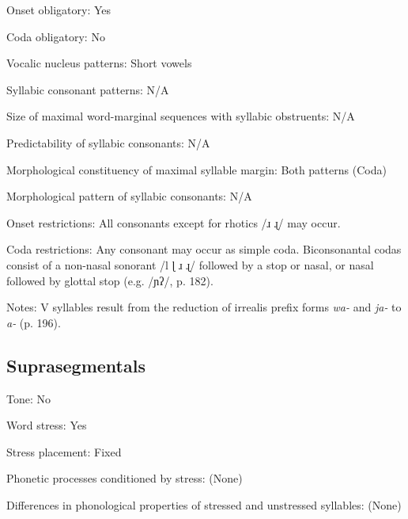 {\begin{appendixdesc}
\item[Onset obligatory:] Yes

\item[Coda obligatory:] No

\item[Vocalic nucleus patterns:] Short vowels

\item[Syllabic consonant patterns:] N/A

\item[Size of maximal word-marginal sequences with syllabic obstruents:] N/A

\item[Predictability of syllabic consonants:] N/A

\item[Morphological constituency of maximal syllable margin:] Both patterns (Coda)

\item[Morphological pattern of syllabic consonants:] N/A

\item[Onset restrictions:] All consonants except for rhotics /ɹ ɻ/ may occur.

\item[Coda restrictions:] Any consonant may occur as simple coda. Biconsonantal codas consist of a non-nasal sonorant /l ɭ ɹ ɻ/ followed by a stop or nasal, or nasal followed by glottal stop (e.g. /ɲʔ/, p. 182).

\item[Notes:] V syllables result from the reduction of irrealis prefix forms \textit{wa-} and \textit{ja-} to \textit{a-} (p. 196).
\end{appendixdesc}
\subsection*{Suprasegmentals}
\begin{appendixdesc}
\item[Tone:] No

\item[Word stress:] Yes

\item[Stress placement:] Fixed

\item[Phonetic processes conditioned by stress:] (None)

\item[Differences in phonological properties of stressed and unstressed syllables:] (None)


\end{appendixdesc}}
